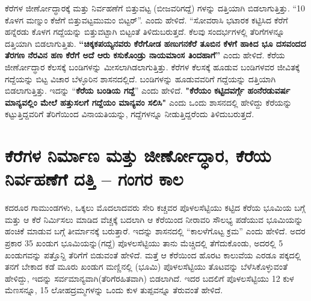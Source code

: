 ಕೆರೆಗಳ ಜೀರ್ಣೋದ್ಧಾರಕ್ಕೆ ಮತ್ತು ನಿರ್ವಹಣೆಗೆ ಬಿತ್ತುವಟ್ಟ (ಬೀಜವರಿಗದ್ದೆ) ಗಳನ್ನು ದತ್ತಿಯಾಗಿ ಬಿಡಲಾಗುತ್ತಿತ್ತು. “10 ಕೊಳಗ ಮಣ್ನುಂ ಕೆಱೆಗೆ ಬಿತ್ತುವಟ್ಟಮುಮಂ ಬಿಟ್ಟರ್​”. ಎಂದು ಹೇಳಿದೆ. “ಸೋವರಾಸಿ ಭಟಾರಕ ಕಟ್ಟಿಸಿದ ಕೆರೆಗೆ ಹನ್ನೆರಡು ಕೊಳಗ ಗದ್ದೆಯನ್ನು ಬಿತ್ತುವಟ್ಟಾಗಿ ಬಿಟ್ಟಂತೆ ತಿಳಿದುಬರುತ್ತದೆ. ಕೆಲವು ಸಂದರ್ಭಗಳಲ್ಲಿ ತೆರಿಗೆಗಳನ್ನೂ ದತ್ತಿಯಾಗಿ ಬಿಡಲಾಗುತ್ತಿತು. \textbf{“ಚಿಕ್ಕಕಪಯ್ಯನವರು ಕೆರೆಗೋಡ ಹಣುಗನಕೆರೆ ತೂಬಿನ ಕೆಳಗೆ ಹಾಕಿದ ಭೂ ದಸವಂದದ ತೆರಗಣ ನೆರವಿನ ಹಣ ಕೆರೆಗೆ ಅದೆ ಆರು ಕಸುಕೊಂಡ್ರು ನಾಯಮಾಂಸ ತಿಂದಹಾಗೆ”} ಎಂದು ಹೇಳಿದೆ. ಕೆರೆಯ ಜೀರ್ಣೋದ್ಧಾರ ಕೆಲಸಕ್ಕೆ ಬಂಡಿಗಳನ್ನು ಮೀಸಲಾಗಿಡಲಾಗುತ್ತಿತ್ತು. ಕೆರೆಗಳ ಕೆಲಸಕ್ಕೆ ಹೂಡುವ ಬಂಡಿಗಳವರ ಜೀವಿತಕ್ಕೆ ಗದ್ದೆಯನ್ನು ಬಿಟ್ಟ ವಿಚಾರ ಬೆಳ್ಳೂರಿನ ಶಾಸನದಲ್ಲಿದೆ. ಬಂಡಿಗಳನ್ನು ಹೂಡುವವರಿಗೆ ಗದ್ದೆಯನ್ನು ದತ್ತಿಯಾಗಿ ಬಿಡಲಾಗುತ್ತಿತ್ತು. ಇದನ್ನು “\textbf{ಕೆರೆಯ ಬಂಡಿಯ ಗದ್ದೆ}” ಎಂದು ಹೇಳಿದೆ.\textbf{ "ಕೆರೆಯಂ ಕಟ್ಟಿದವರ್ಗ್ಗೆ ಹಂನೆರಡುವರ್ಷ ಮಾನ್ಯವಲ್ಲಿಂ ಮೇಲೆ ಹತ್ತುಸಲಗೆ ಗದ್ದೆಯಂ ಮಾನ್ಯವಂ ಸಲಿಸಿ" }ಎಂದು ಒಂದು ಶಾಸನದಲ್ಲಿ ಹೇಳಿದ್ದು ಕೆರೆಯನ್ನು ಕಟ್ಟುತ್ತಿದ್ದವರಿಗೆ ತೆರಿಗೆಯಿಂದ ವಿನಾಯತಿಯನ್ನು, ಗದ್ದೆಗಳನ್ನೂ ನೀಡುತ್ತಿದ್ದರೆಂದು ತಿಳಿದುಬರುತ್ತದೆ.


\section{ಕೆರೆಗಳ ನಿರ್ಮಾಣ ಮತ್ತು ಜೀರ್ಣೋದ್ಧಾರ, ಕೆರೆಯ ನಿರ್ವಹಣೆಗೆ ದತ್ತಿ – ಗಂಗರ ಕಾಲ}

ಕದರೂರ ಗಾಮುಂಡಗಳು, ಒಕ್ಕಲು ಮೊದಲಾದವರು ಸೇರಿ ಕಚ್ಚವರ ಪೊಳಲಸೆಟ್ಟಿಯು ಕಟ್ಟಿದ ಕೆರೆಯ ಭೂಮಿಯ ಬಗ್ಗೆ ಮತ್ತು ಆ ಕೆರೆ ನಿರ್ಮಿಸಲು ಮಾಡಿದ ವೆಚ್ಚಕ್ಕೆ ಬದಲಾಗಿ ಆ ಕೆರೆಯಿಂದ ನೀರಾವರಿ ಸೌಲಭ್ಯ ಪಡೆಯುವ ಭೂಮಿಯನ್ನು ಹಂಚಿಕೆ ಮಾಡುವ ಬಗ್ಗೆ ತೀರ್ಮಾನಕ್ಕೆ ಬರುತ್ತಾರೆ. ಇದನ್ನು ಶಾಸನದಲ್ಲಿ “ಕಾಲಳೆಗೊಟ್ಟ ಕ್ರಮ” ಎಂದು ಹೇಳಿದೆ. ಅದರ ಪ್ರಕಾರ 35 ಖಂಡುಗ ಭೂಮಿಯನ್ನು(ಗದ್ದೆ) ಪೊಳಲಸೆಟ್ಟಿಯು ತಾನು ಮೆಚ್ಚಿದಲ್ಲಿ ತೆಗೆದುಕೊಂಡು, ಅದರಲ್ಲಿ 5 ಖಂಡುಗವನ್ನು ಪತ್ತೊನ್ದಿ ತೆರಿಗೆಗೆ ಬಿಡುವಂತೆ ಹೇಳಿದೆ. ಮತ್ತೆ ಆ ಕೆರೆಯಿಂದ ಹೊರಟ ಕಾಲುವೆಯ ಎರಡೂ ಪಕ್ಕದಲ್ಲಿ ತನಗೆ ಬೇಕಾದ ಕಡೆ ಮೂರು ಖಂಡುಗ ಮಣ್ಣಿನಲ್ಲಿ (ಭೂಮಿ) ಪೊಳಲಸೆಟ್ಟಿಯು ತೊಟವನ್ನು ಬೆಳೆಸಿಕೊಳ್ಳುವಂತೆ ಹೇಳಿದ್ದು, ಇದನ್ನು ಸರ್ವಮಾನ್ಯವಾಗಿ(ತೆರಿಗೆರಹಿತವಾಗಿ) ಬಿಡಲಾಗಿದೆ. ಇದರ ಬದಲಿಗೆ ಪೊಳಲಸೆಟ್ಟಿಯು 12 ಕುಳ ಮೆಣಸನ್ನೂ, 15 ಲೋಹದ್ರಮ್ಮಗಳನ್ನು ಒಂದು ಕುಳ ತುಪ್ಪವನ್ನೂ ತೆರುವಂತೆ ಹೇಳಿದೆ.


